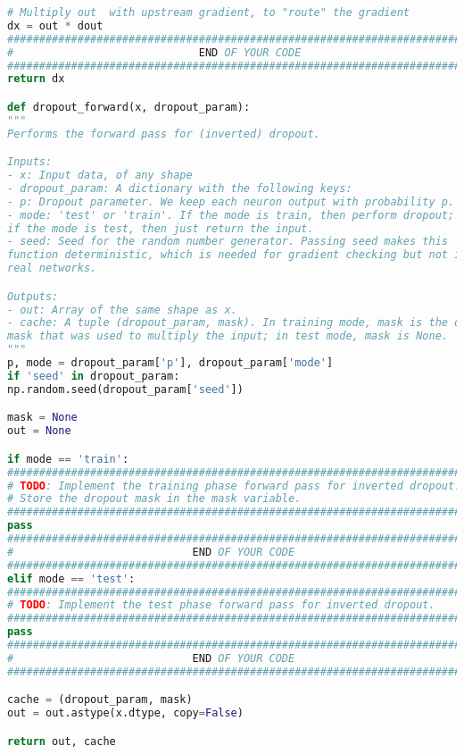 \begin{lstlisting}[language=Python, label=lst:layers.py, caption={layers.py}, basicstyle=\tiny]
# Multiply out  with upstream gradient, to "route" the gradient
dx = out * dout
#############################################################################
#                             END OF YOUR CODE                              #
#############################################################################
return dx

def dropout_forward(x, dropout_param):
"""
Performs the forward pass for (inverted) dropout.

Inputs:
- x: Input data, of any shape
- dropout_param: A dictionary with the following keys:
- p: Dropout parameter. We keep each neuron output with probability p.
- mode: 'test' or 'train'. If the mode is train, then perform dropout;
if the mode is test, then just return the input.
- seed: Seed for the random number generator. Passing seed makes this
function deterministic, which is needed for gradient checking but not in
real networks.

Outputs:
- out: Array of the same shape as x.
- cache: A tuple (dropout_param, mask). In training mode, mask is the dropout
mask that was used to multiply the input; in test mode, mask is None.
"""
p, mode = dropout_param['p'], dropout_param['mode']
if 'seed' in dropout_param:
np.random.seed(dropout_param['seed'])

mask = None
out = None

if mode == 'train':
###########################################################################
# TODO: Implement the training phase forward pass for inverted dropout.   #
# Store the dropout mask in the mask variable.                            #
###########################################################################
pass
###########################################################################
#                            END OF YOUR CODE                             #
###########################################################################
elif mode == 'test':
###########################################################################
# TODO: Implement the test phase forward pass for inverted dropout.       #
###########################################################################
pass
###########################################################################
#                            END OF YOUR CODE                             #
###########################################################################

cache = (dropout_param, mask)
out = out.astype(x.dtype, copy=False)

return out, cache



\end{lstlisting}
